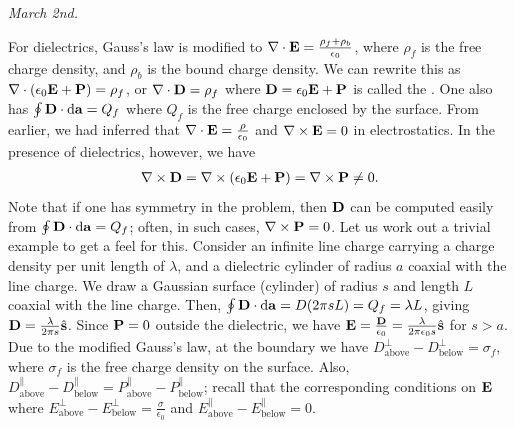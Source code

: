 \noindent \textit{March 2nd.}

For dielectrics, Gauss's law is modified to $\nabla \cdot \mathbf{E} = \frac{\rho_{f} + \rho_{b}}{\epsilon_{0}}$, where $\rho_{f}$ is the free charge density, and $\rho_{b}$ is the bound charge density. We can rewrite this as $\nabla \cdot (\epsilon_{0} \mathbf{E} + \mathbf{P}) = \rho_{f}$, or $\nabla \cdot \mathbf{D} = \rho_{f}$ where $\mathbf{D} = \epsilon_{0} \mathbf{E} + \mathbf{P}$ is called the . One also has $\oint \mathbf{D} \cdot \mathrm{d}\mathbf{a} = Q_{f}$ where $Q_{f}$ is the free charge enclosed by the surface. From earlier, we had inferred that $\nabla \cdot \mathbf{E} = \frac{\rho}{\epsilon_{0}}$ and $\nabla \times \mathbf{E} = 0$ in electrostatics. In the presence of dielectrics, however, we have
\begin{align}
    \nabla \times \mathbf{D} = \nabla \times (\epsilon_{0} \mathbf{E} + \mathbf{P}) = \nabla \times \mathbf{P} \neq 0.
\end{align}
Note that if one has symmetry in the problem, then $\mathbf{D}$ can be computed easily from $\oint \mathbf{D} \cdot \mathrm{d}\mathbf{a} = Q_{f}$; often, in such cases, $\nabla \times \mathbf{P} = 0$. Let us work out a trivial example to get a feel for this. Consider an infinite line charge carrying a charge density per unit length of $\lambda$, and a dielectric cylinder of radius $a$ coaxial with the line charge. We draw a Gaussian surface (cylinder) of radius $s$ and length $L$ coaxial with the line charge. Then, $\oint \mathbf{D} \cdot \mathrm{d}\mathbf{a} = D(2 \pi s L) = Q_{f} = \lambda L$, giving $\mathbf{D} = \frac{\lambda}{2 \pi s} \hat{\mathbf{s}}$. Since $\mathbf{P} = 0$ outside the dielectric, we have $\mathbf{E} = \frac{\mathbf{D}}{\epsilon_{0}} = \frac{\lambda}{2 \pi \epsilon_{0} s} \hat{\mathbf{s}}$ for $s > a$.\\ 

Due to the modified Gauss's law, at the boundary we have $D^{\perp}_{\text{above}} - D^{\perp}_{\text{below}} = \sigma_{f}$, where $\sigma_{f}$ is the free charge density on the surface. Also, $D^{\parallel}_{\text{above}} - D^{\parallel}_{\text{below}} = P^{\parallel}_{\text{above}} - P^{\parallel}_{\text{below}}$; recall that the corresponding conditions on $\mathbf{E}$ where $E^{\perp}_{\text{above}} - E^{\perp}_{\text{below}} = \frac{\sigma}{\epsilon_{0}}$ and $E^{\parallel}_{\text{above}} - E^{\parallel}_{\text{below}} = 0$. 

